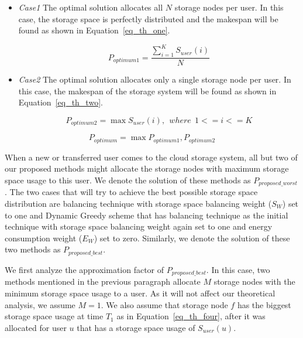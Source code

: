 \begin{itemize}
\item \textit{Case1} The optimal solution allocates all $N$ storage nodes per user. In this case,
the storage space is perfectly distributed and the makespan will be found as shown in Equation~\eqref{eq_th_one}.

\begin{equation}
P_{optimum1} = \frac{\sum\limits_{i=1}^{K} S_{user}(i)}{N}
\label{eq_th_one}
\end{equation}
\hfill

\item \textit{Case2} The optimal solution allocates only a single storage node per user. In this
case, the makespan of the storage system will be found as shown in Equation~\eqref{eq_th_two}.

\begin{equation}
P_{optimum2} = \max{S_{user}(i)},\ \ where\ \ 1 <= i <= K
\label{eq_th_two}
\end{equation}
\hfill
\end{itemize}

\begin{equation}
P_{optimum} = \max{P_{optimum1}, P_{optimum2}}
\label{eq_th_three}
\end{equation}
\hfill

When a new or transferred user comes to the cloud storage system, all but two of our proposed
methods might allocate the storage nodes with maximum storage space usage to this user.
We denote the solution of these methods as $P_{proposed\_worst}$. The two cases that will try
to achieve the best possible storage space distribution are balancing technique with storage
space balancing weight ($S_W$) set to one and Dynamic Greedy scheme that has balancing technique
as the initial technique with storage space balancing weight again set to one and energy consumption
weight ($E_W$) set to zero. Similarly, we denote the solution of these two methods as $P_{proposed\_best}$.

We first analyze the approximation factor of $P_{proposed\_best}$. In this case, two methods
mentioned in the previous paragraph allocate $M$ storage nodes with the minimum storage space usage
to a user. As it will not affect our theoretical analysis, we assume $ M = 1 $. We also assume that
storage node $f$ has the biggest storage space usage at time $T_1$ as in Equation~\eqref{eq_th_four}, after
it was allocated for user $u$ that has a storage space usage of $S_{user}(u)$.

